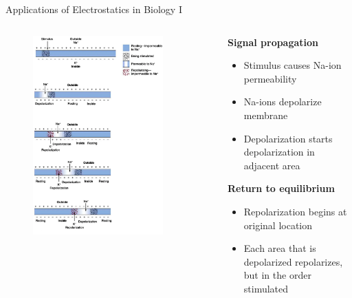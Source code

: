 \documentclass{beamer}
\begin{document}
\begin{frame}{Applications of Electrostatics in Biology I}
\small
\begin{columns}[T]
\begin{column}{0.5\textwidth}
\begin{figure}
\centering
\includegraphics[width=0.85\textwidth]{figures/nerve_prop.png}
\caption{\label{fig:nerve3}}
\end{figure}
\end{column}
\begin{column}{0.5\textwidth}
\textbf{Signal propagation}
\begin{itemize}
\item Stimulus causes Na-ion permeability
\item Na-ions depolarize membrane
\item Depolarization starts depolarization in adjacent area
\end{itemize}
\textbf{Return to equilibrium}
\begin{itemize}
\item Repolarization begins at original location
\item Each area that is depolarized repolarizes, but in the order stimulated
\end{itemize}
\end{column}
\end{columns}
\end{frame}
\end{document}

